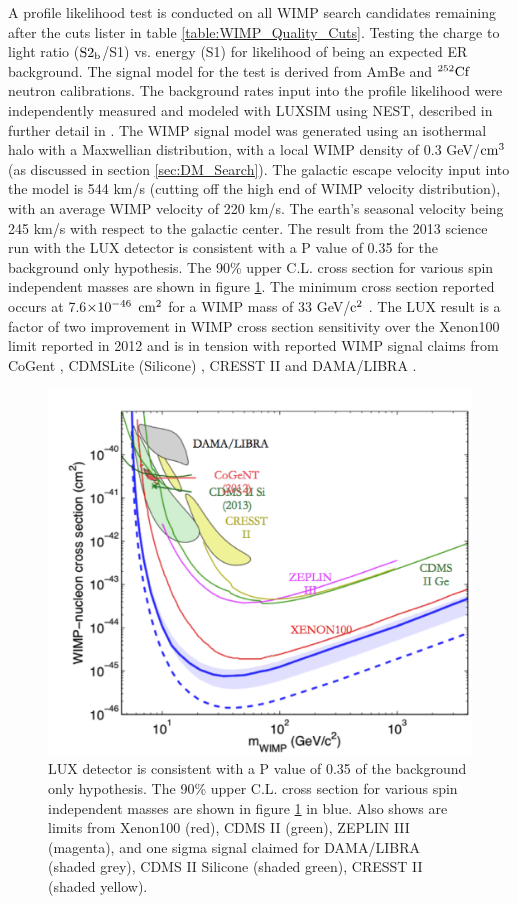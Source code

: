 A profile likelihood test is conducted on all WIMP search candidates remaining after the cuts lister in table \ref{table:WIMP_Quality_Cuts}. Testing the charge to light ratio ($\rm S2_b$/S1) vs. energy (S1) for likelihood of being an expected ER background. The signal model for the test is derived from AmBe and $\rm^{252}Cf$ neutron calibrations. The background rates input into the profile likelihood were independently measured and modeled with LUXSIM using NEST, described in further detail in \cite{LUX_BG} \cite{LUX_PRL} \cite{NEST_2013}. The WIMP signal model was generated using an isothermal halo with a Maxwellian distribution, with a local WIMP density of 0.3 GeV/$\rm cm^3$ (as discussed in section \ref{sec:DM_Search}). The galactic escape velocity input into the model is 544 km/s (cutting off the high end of WIMP velocity distribution), with an average WIMP velocity of 220 km/s. The earth's seasonal velocity being 245 km/s with respect to the galactic center. The result from the 2013 science run with the LUX detector is consistent with a P value of 0.35 for the background only hypothesis. The 90\% upper C.L. cross section for various spin independent masses are shown in figure \ref{fig:LUX_Limit}. The minimum cross section reported occurs at 7.6$\rm\times10^{-46}$ $\rm cm^2$ for a WIMP mass of 33 GeV/$\rm c^2$ \cite{LUX_PRL}. The LUX result is a factor of two improvement in WIMP cross section sensitivity over the Xenon100 limit reported in 2012 \cite{Xenon100} and is in tension with reported WIMP signal claims from CoGent \cite{CoGeNT}, CDMSLite (Silicone) \cite{CDMSlite}, CRESST II \cite{CRESSTII} and DAMA/LIBRA \cite{DAMA}.

 \begin{figure}[h!]\centering
\includegraphics[width=120mm]{Chapter_LUX_Det/LUX_Limit.png}
\caption{LUX detector is consistent with a P value of 0.35 of the background only hypothesis. The 90\% upper C.L. cross section for various spin independent masses are shown in figure \ref{fig:LUX_Limit} in blue. Also shows are limits from Xenon100 (red), CDMS II (green), ZEPLIN III (magenta), and one sigma signal claimed for DAMA/LIBRA (shaded grey), CDMS II Silicone (shaded green), CRESST II (shaded yellow).}
\label{fig:LUX_Limit}
\end{figure}

